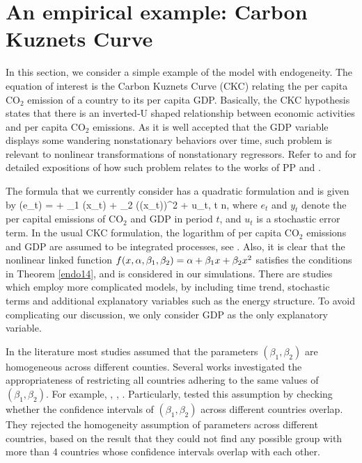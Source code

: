 
\section{An empirical example: Carbon Kuznets Curve} 

In this section, we consider a simple example of the model with endogeneity. The equation of interest is the Carbon Kuznets Curve (CKC) relating the per capita CO$_2$ emission of a country to its per capita GDP. Basically, the CKC hypothesis states that there is an inverted-U shaped relationship between economic activities and per capita CO$_2$ emissions. As it is well accepted that the GDP variable displays some wandering nonstationary behaviors over time, such problem is relevant to nonlinear transformations of nonstationary regressors. Refer to \cite{wagner2008} and \cite{mullerwagner2007} for detailed expositions of how such problem relates to the works of PP and \cite{changparkphillips2001}.

The formula that we currently consider has a quadratic formulation and is given by
\be {}
\ln(e_{t}) = \al + \beta_1 \ln(x_t) + \beta_2 (\ln(x_t))^2 + u_t,  \le t \le n,
\ee
where $e_t$ and $y_t$ denote the per capital emissions of CO$_2$ and GDP in period $t$, and $u_t$ is a stochastic error term. In the usual CKC formulation, the logarithm of per capita CO$_2$ emissions and GDP are assumed to be integrated processes, see \cite{mullerwagner2007}. Also, it is clear that the nonlinear linked function $f(x, \alpha, \beta_1, \beta_2) = \alpha + \beta_1 x + \beta_2 x^2$ satisfies the conditions in Theorem \ref{endo14}, and is considered in our simulations. There are studies which employ more complicated models, by including time trend, stochastic terms and additional explanatory variables such as the energy structure. To avoid complicating our discussion, we only consider GDP as the only explanatory variable.

In the literature most studies assumed that the parameters $(\beta_1, \beta_2)$ are homogeneous across different counties. Several works investigated the appropriateness of restricting all countries adhering to the same values of $(\beta_1, \beta_2)$. For example, \cite{listgallet1999}, \cite{dijkgraafvollebergh2005}, \cite{piaggiopadilla2010}. Particularly, \cite{piaggiopadilla2010} tested this assumption by checking whether the confidence intervals of $(\beta_1, \beta_{2})$ across different countries overlap. They rejected the homogeneity assumption of parameters across different countries, based on the result that they could not find any possible group with more than 4 countries whose confidence intervals overlap with each other.

